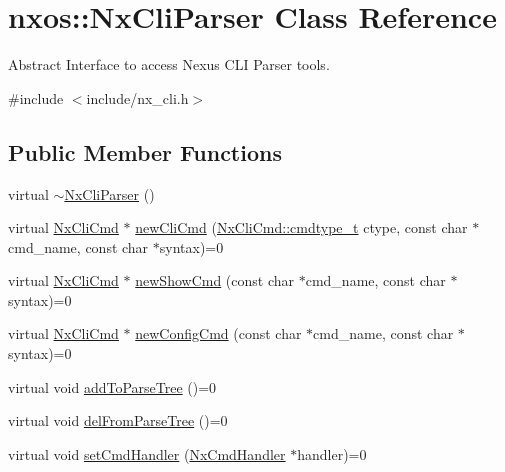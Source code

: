 \hypertarget{classnxos_1_1_nx_cli_parser}{}\section{nxos\+:\+:Nx\+Cli\+Parser Class Reference}
\label{classnxos_1_1_nx_cli_parser}


Abstract Interface to access Nexus C\+LI Parser tools.  




{\ttfamily \#include $<$include/nx\+\_\+cli.\+h$>$}

\subsection*{Public Member Functions}
\begin{DoxyCompactItemize}
\item 
virtual \mbox{\hyperlink{classnxos_1_1_nx_cli_parser_ae7d5ada6ff25efd19ba95161fa60eeac}{$\sim$\+Nx\+Cli\+Parser}} ()
\item 
virtual \mbox{\hyperlink{classnxos_1_1_nx_cli_cmd}{Nx\+Cli\+Cmd}} $\ast$ \mbox{\hyperlink{classnxos_1_1_nx_cli_parser_a210cbbb8b312093285741f753c4cdcda}{new\+Cli\+Cmd}} (\mbox{\hyperlink{classnxos_1_1_nx_cli_cmd_a82ed104f13c7859b24d3c0527f706be1}{Nx\+Cli\+Cmd\+::cmdtype\+\_\+t}} ctype, const char $\ast$cmd\+\_\+name, const char $\ast$syntax)=0
\item 
virtual \mbox{\hyperlink{classnxos_1_1_nx_cli_cmd}{Nx\+Cli\+Cmd}} $\ast$ \mbox{\hyperlink{classnxos_1_1_nx_cli_parser_ac07fa22d7d83d4c9015ea1f3976163d8}{new\+Show\+Cmd}} (const char $\ast$cmd\+\_\+name, const char $\ast$syntax)=0
\item 
virtual \mbox{\hyperlink{classnxos_1_1_nx_cli_cmd}{Nx\+Cli\+Cmd}} $\ast$ \mbox{\hyperlink{classnxos_1_1_nx_cli_parser_a51481c851ccf87288513ba73e0380895}{new\+Config\+Cmd}} (const char $\ast$cmd\+\_\+name, const char $\ast$syntax)=0
\item 
virtual void \mbox{\hyperlink{classnxos_1_1_nx_cli_parser_a3c5295a4b2de3068d1653a6c303a22ee}{add\+To\+Parse\+Tree}} ()=0
\item 
virtual void \mbox{\hyperlink{classnxos_1_1_nx_cli_parser_a169976099ecf7a05277bfc72259ff1bc}{del\+From\+Parse\+Tree}} ()=0
\item 
virtual void \mbox{\hyperlink{classnxos_1_1_nx_cli_parser_a711e36619a40625ebf62b59693529d88}{set\+Cmd\+Handler}} (\mbox{\hyperlink{classnxos_1_1_nx_cmd_handler}{Nx\+Cmd\+Handler}} $\ast$handler)=0
\item 

\end{DoxyCompactItemize}
